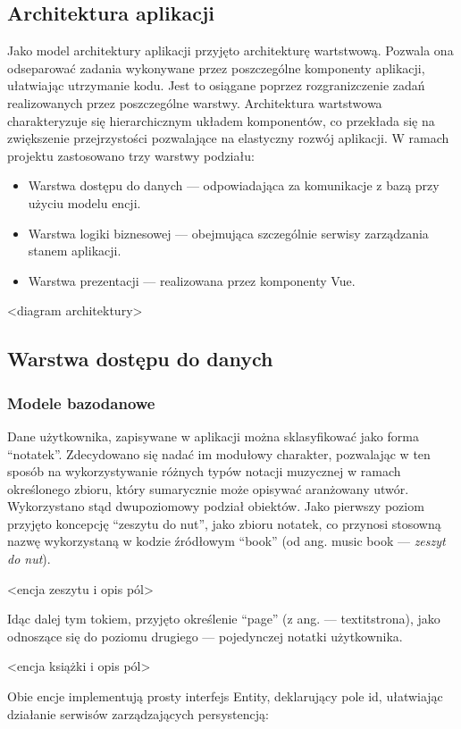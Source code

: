 \subsection{Architektura aplikacji}
Jako model architektury aplikacji przyjęto architekturę wartstwową. Pozwala ona odseparować zadania wykonywane przez
poszczególne komponenty aplikacji, ułatwiając utrzymanie kodu. Jest to osiągane poprzez rozgranizczenie zadań
realizowanych przez poszczególne warstwy. Architektura wartstwowa charakteryzuje się hierarchicznym układem komponentów,
co przekłada się na zwiększenie przejrzystości pozwalające na elastyczny rozwój aplikacji.
W ramach projektu zastosowano trzy warstwy podziału:
\begin{itemize}
	\item Warstwa dostępu do danych — odpowiadająca za komunikacje z bazą przy użyciu modelu encji.
	\item Warstwa logiki biznesowej — obejmująca szczególnie serwisy zarządzania stanem aplikacji.
	\item Warstwa prezentacji — realizowana przez komponenty Vue.
\end{itemize}

<diagram architektury>

\subsection{Warstwa dostępu do danych}
\subsubsection{Modele bazodanowe}
Dane użytkownika, zapisywane w aplikacji można sklasyfikować jako forma \enquote{notatek}.
Zdecydowano się nadać im modułowy charakter, pozwalając w ten sposób na wykorzystywanie różnych typów notacji muzycznej
w ramach określonego zbioru, który sumarycznie może opisywać aranżowany utwór.
Wykorzystano stąd dwupoziomowy podział obiektów. Jako pierwszy poziom przyjęto koncepcję
\enquote{zeszytu do nut}, jako zbioru notatek,
co przynosi stosowną nazwę wykorzystaną w kodzie źródłowym \enquote{book} (od ang.
music book — \textit{zeszyt do nut}).

<encja zeszytu i opis pól>

Idąc dalej tym tokiem, przyjęto określenie \enquote{page} (z ang. — textit{strona}),
jako odnoszące się do poziomu drugiego — pojedynczej notatki użytkownika.

<encja książki i opis pól>

Obie encje implementują prosty interfejs Entity, deklarujący pole id,
ułatwiając działanie serwisów zarządzających persystencją:

